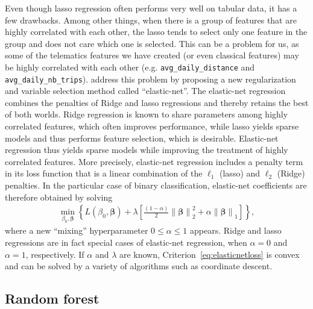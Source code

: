 \documentclass{article}
\newcommand{\norm}[1]{\left\lVert#1\right\rVert}
\begin{document}
Even though lasso regression often performs very well on tabular data, it has a few drawbacks. Among other things, when there is a group of features that are highly correlated with each other, the lasso tends to select only one feature in the group and does not care which one is selected. This can be a problem for us, as some of the telematics features we have created (or even classical features) may be highly correlated with each other (e.g. \texttt{avg\_daily\_distance} and \texttt{avg\_daily\_nb\_trips}). \cite{zou2005regularization} address this problem by proposing a new regularization and variable selection method called ``elastic-net''. The elastic-net regression combines the penalties of Ridge and lasso regressions and thereby retains the best of both worlds. Ridge regression is known to share parameters among highly correlated features, which often improves performance, while lasso yields sparse models and thus performs feature selection, which is desirable. Elastic-net regression thus yields sparse models while improving the treatment of highly correlated features. More precisely, elastic-net regression includes a penalty term in its loss function that is a linear combination of the $\ell_1$ (lasso) and $\ell_2$ (Ridge) penalties. In the particular case of binary classification, elastic-net coefficients are therefore obtained by solving
\begin{align}
    \min_{\beta_0, \boldsymbol{\beta}} \left\{L(\beta_0, \boldsymbol{\beta}) + \lambda \left[\frac{(1 - \alpha)}{2} \norm{\boldsymbol{\beta}}_2^2 + \alpha \norm{\boldsymbol{\beta}}_1 \right]\right\},
    \label{eq:elasticnetloss}
\end{align}
where a new ``mixing'' hyperparameter $0 \le \alpha \le 1$ appears. Ridge and lasso regressions are in fact special cases of elastic-net regression, when $\alpha = 0$ and $\alpha = 1$, respectively. If $\alpha$ and $\lambda$ are known, Criterion~\ref{eq:elasticnetloss} is convex and can be solved by a variety of algorithms such as coordinate descent.

\subsection{Random forest}
\end{document}
